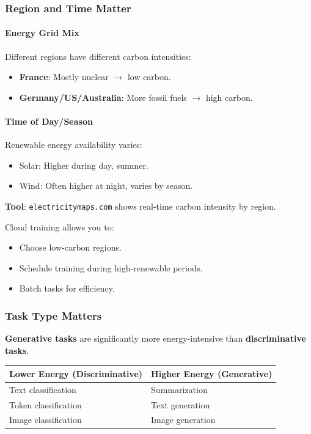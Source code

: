 \subsubsection*{Region and Time Matter}

\paragraph*{Energy Grid Mix}
Different regions have different carbon intensities:
\begin{itemize}
  \item \textbf{France}: Mostly nuclear $\to$ low carbon.
  \item \textbf{Germany/US/Australia}: More fossil fuels $\to$ high carbon.
\end{itemize}

\paragraph*{Time of Day/Season}
Renewable energy availability varies:
\begin{itemize}
  \item Solar: Higher during day, summer.
  \item Wind: Often higher at night, varies by season.
\end{itemize}

\textbf{Tool}: \texttt{electricitymaps.com} shows real-time carbon intensity by region.

\begin{tipbox}
Cloud training allows you to:
\begin{itemize}
  \item Choose low-carbon regions.
  \item Schedule training during high-renewable periods.
  \item Batch tasks for efficiency.
\end{itemize}
\end{tipbox}

\subsubsection*{Task Type Matters}

\textbf{Generative tasks} are significantly more energy-intensive than \textbf{discriminative tasks}.

\begin{center}
\renewcommand{\arraystretch}{1.3}
\begin{tabular}{@{} l l @{}}
\toprule
\textbf{Lower Energy (Discriminative)} & \textbf{Higher Energy (Generative)} \\
\midrule
Text classification & Summarization \\
Token classification & Text generation \\
Image classification & Image generation \\
\bottomrule
\end{tabular}
\end{center}

